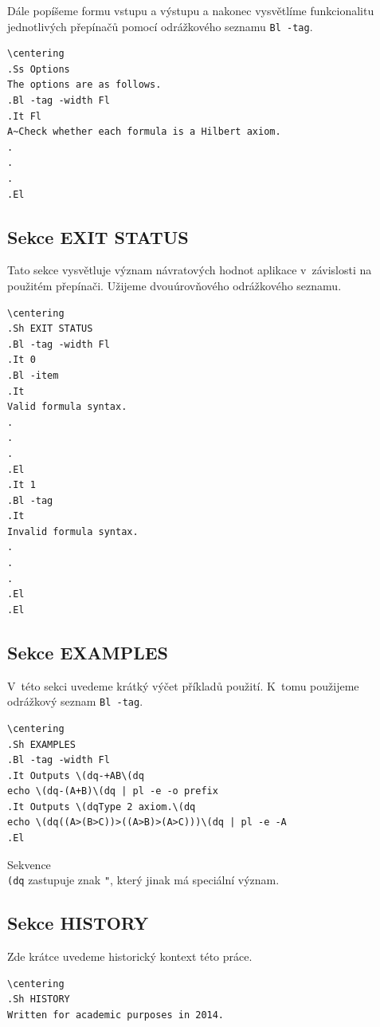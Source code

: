 \documentclass[thesis=B,czech,hidelinks]{thesis}[2012/06/26]
\begin{document}
Dále popíšeme formu vstupu a výstupu a nakonec vysvětlíme funkcionalitu jednotlivých přepínačů pomocí odrážkového seznamu \texttt{Bl -tag}.

\begin{verbatim}
\centering
.Ss Options
The options are as follows.
.Bl -tag -width Fl
.It Fl
A~Check whether each formula is a Hilbert axiom.
.
.
.
.El
\end{verbatim}

\subsection{Sekce EXIT STATUS}

Tato sekce vysvětluje význam návratových hodnot aplikace v~závislosti na použitém přepínači. Užijeme dvouúrovňového odrážkového seznamu.

\begin{verbatim}
\centering
.Sh EXIT STATUS
.Bl -tag -width Fl
.It 0
.Bl -item
.It
Valid formula syntax.
.
.
.
.El
.It 1
.Bl -tag
.It
Invalid formula syntax.
.
.
.
.El
.El
\end{verbatim}

\subsection{Sekce EXAMPLES}

V~této sekci uvedeme krátký výčet příkladů použití. K~tomu použijeme odrážkový seznam \texttt{Bl -tag}.

\begin{verbatim}
\centering
.Sh EXAMPLES
.Bl -tag -width Fl
.It Outputs \(dq-+AB\(dq
echo \(dq-(A+B)\(dq | pl -e -o prefix
.It Outputs \(dqType 2 axiom.\(dq
echo \(dq((A>(B>C))>((A>B)>(A>C)))\(dq | pl -e -A
.El
\end{verbatim}

Sekvence \texttt{\\(dq} zastupuje znak \texttt{"}, který jinak má speciální význam.

\subsection{Sekce HISTORY}

Zde krátce uvedeme historický kontext této práce.

\begin{verbatim}
\centering
.Sh HISTORY
Written for academic purposes in 2014.
\end{verbatim}
\end{document}
